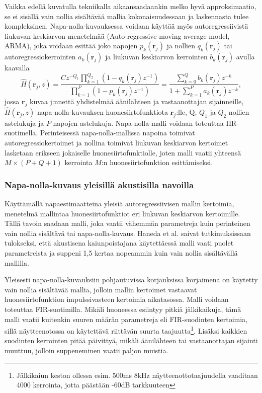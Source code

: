 \documentclass[finnish,12pt]{article}
\begin{document}
Vaikka edellä kuvatulla tekniikalla aikaansaadaankin melko hyvä approksimaatio, se ei sisällä vain nollia sisältävää mallia kokonaisuudessaan ja laskennasta tulee kompleksinen. Napa-nolla-kuvauksessa voidaan käyttää myös autoregressiivistä liukuvan keskiarvon menetelmää (Auto-regressive moving average model, ARMA), joka voidaan esittää joko napojen $p_k(\textbf{r}_j)$ ja nollien $q_k(\textbf{r}_j)$ tai autoregressiokerrointen $a_k(\textbf{r}_j)$ ja liukuvan keskiarvon kerrointen $b_k(\textbf{r}_j)$ avulla kaavalla \begin{equation}
\hat{H}(\textbf{r}_j,z) = \frac{Cz^{-Q_1} \prod\limits_{k=1}^{Q_2} \left( 1 - q_k(\textbf{r}_j) z^{-1} \right) }{\prod\limits_{k=1}^P \left( 1 - p_k(\textbf{r}_j) z^{-1} \right) } = \frac{\sum\limits_{k=0}^Q b_k(\textbf{r}_j) z^{-k}}{1 + \sum\limits_{k=1}^P a_k(\textbf{r}_j) z^{-k}},
\end{equation} jossa $\textbf{r}_j$ kuvaa j:nnettä yhdistelmää äänilähteen ja vastaanottajan sijainneille, $\hat{H}(\textbf{r}_j,z)$ napa-nolla-kuvauksen huonesiirtofunktiota $\textbf{r}_j$:lle, Q, $Q_1$ ja $Q_2$ nollien astelukuja ja $P$ napojen astelukuja. Napa-nolla-malli voidaan toteuttaa IIR-suotimella. Perinteisessä napa-nolla-mallissa napoina toimivat autoregressiokertoimet ja nollina toimivat liukuvan keskiarvon kertoimet lasketaan erikseen jokaiselle huonesiirtofunktiolle, joten malli vaatii yhteensä $M \times (P+Q+1)$ kerrointa $M$:n huonesiirtofunktion esittämiseksi. \cite{YHaneda1994}

\subsubsection{Napa-nolla-kuvaus yleisillä akustisilla navoilla}

Käyttämällä napaestimaatteina yleisiä autoregressiivisen mallin kertoimia, menetelmä mallintaa huonesiirtofunktiot eri liukuvan keskiarvon kertoimille. Tällä tavoin saadaan malli, joka vaatii vähemmän parametreja kuin perinteinen vain nollia sisältävä tai napa-nolla-kuvaus. Haneda et al. \cite{YHaneda1994} saivat tutkimuksissaan tulokseksi, että akustisena kaiunpoistajana käytettäessä malli vaati puolet parametreista ja suppeni 1,5 kertaa nopeammin kuin vain nollia sisältävällä mallilla.

Yleisesti napa-nolla-kuvauksiin pohjautuvissa korjauksissa korjaimena on käytetty vain nollia sisältävää mallia, jolloin mallin kertoimet vastaavat huonesiirtofunktion impulssivasteen kertoimia aikatasossa. Malli voidaan toteuttaa FIR-suotimilla. Mikäli huoneessa esiintyy pitkiä jälkikaikuja, tämä malli vaatii kuitenkin suuren määrän parametreja eli FIR-suodinten kertoimia, sillä näytteenotossa on käytettävä riittävän suurta taajuutta\footnote{Jälkikaiun keston ollessa esim. 500ms 8kHz näytteenottotaajuudella vaaditaan 4000 kerrointa, jotta päästään -60dB tarkkuuteen}. Lisäksi kaikkien suodinten kerrointen pitää päivittyä, mikäli äänilähteen tai vastaanottajan sijainti muuttuu, jolloin suppeneminen vaatii paljon muistia. \cite{YHaneda1994}
\end{document}
